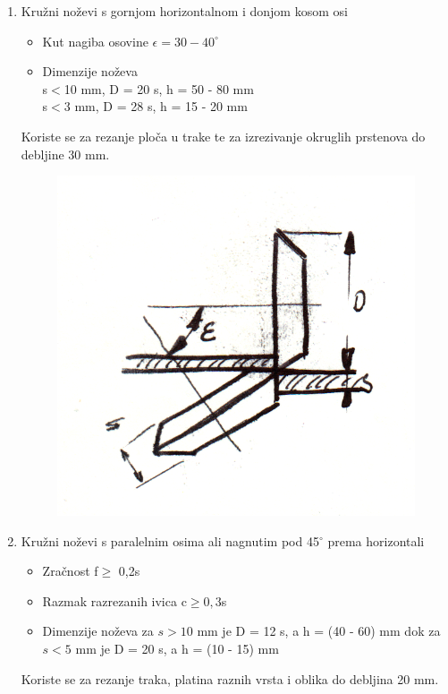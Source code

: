 \documentclass[a4paper,12pt]{article}
\numberwithin{figure}{section}
\begin{document}
\begin{enumerate}
\begin{figure}[!h]
\end{figure}
\FloatBarrier
\item Kružni noževi s gornjom horizontalnom i donjom kosom osi
\begin{itemize}
\item Kut nagiba osovine $\epsilon = 30-40^{\circ}$
\item Dimenzije noževa \\
s$<$10 mm, D = 20 s, h = 50 - 80 mm\\
s$<$3 mm, D = 28 s, h = 15 - 20 mm
\end{itemize}
Koriste se za rezanje ploča u trake te za izrezivanje okruglih prstenova do debljine 30 mm.
\begin{figure}[!h]
\centering
\includegraphics[scale=0.2]{image_54-3.png}
\end{figure}
\FloatBarrier
\item Kružni noževi s paralelnim osima ali nagnutim pod 45$^{\circ}$ prema horizontali 
\begin{itemize}
\item Zračnost f$\geqslant$ 0,2s
\item Razmak razrezanih ivica c$\geqslant 0,3$s
\item Dimenzije noževa za $s>10$ mm je D = 12 s, a h = (40 - 60) mm dok za $s<5$ mm je D = 20 s, a h = (10 - 15) mm
\end{itemize}
Koriste se za rezanje traka, platina raznih vrsta i oblika do debljina 20 mm.

\end{enumerate}
\end{document}
